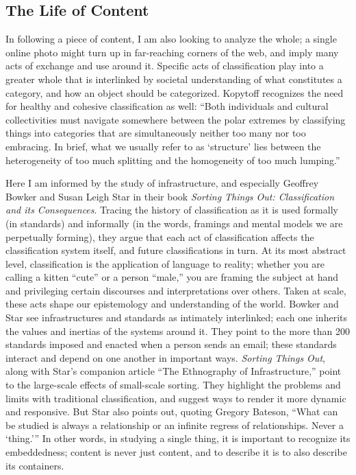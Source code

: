 \subsection{The Life of Content}



In following a piece of content, I am also looking to analyze the whole; a single online photo might turn up in far-reaching corners of the web, and imply many acts of exchange and use around it. Specific acts of classification play into a greater whole that is interlinked by societal understanding of what constitutes a category, and how an object should be categorized. Kopytoff recognizes the need for healthy and cohesive classification as well: ``Both individuals and cultural collectivities must navigate somewhere between the polar extremes by classifying things into categories that are simultaneously neither too many nor too embracing. In brief, what we usually refer to as `structure' lies between the heterogeneity of too much splitting and the homogeneity of too much lumping.''\autocite{kopytoff}

Here I am informed by the study of infrastructure, and especially Geoffrey Bowker and Susan Leigh Star in their book \emph{Sorting Things Out: Classification and its Consequences}. Tracing the history of classification as it is used formally (in standards) and informally (in the words, framings and mental models we are perpetually forming), they argue that each act of classification affects the classification system itself, and future classifications in turn. At its most abstract level, classification is the application of language to reality; whether you are calling a kitten ``cute'' or a person ``male,'' you are framing the subject at hand and privileging certain discourses and interpretations over others. Taken at scale, these acts shape our epistemology and understanding of the world. Bowker and Star see infrastructures and standards as intimately interlinked; each one inherits the values and inertias of the systems around it. They point to the more than 200 standards imposed and enacted when a person sends an email; these standards interact and depend on one another in important ways.\autocite{bowker_star} \emph{Sorting Things Out}, along with Star's companion article ``The Ethnography of Infrastructure,'' point to the large-scale effects of small-scale sorting. They highlight the problems and limits with traditional classification, and suggest ways to render it more dynamic and responsive. But Star also points out, quoting Gregory Bateson, ``What can be studied is always a relationship or an infinite regress of relationships. Never a `thing.'\thinspace''\autocite{star_ethnography_of_infrastructure} In other words, in studying a single thing, it is important to recognize its embeddedness; content is never just content, and to describe it is to also describe its containers.

